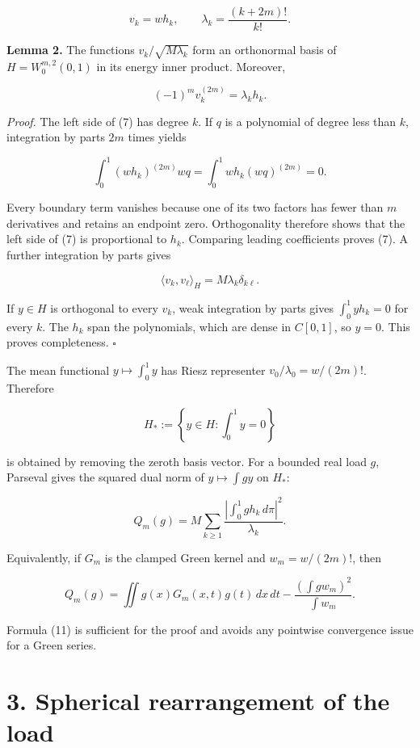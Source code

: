\documentclass[11pt]{article}
\begin{document}
\[
v_k=wh_k,\qquad \lambda_k=\frac{(k+2m)!}{k!}.
\tag{6}
\]

\textbf{Lemma 2.} The functions \(v_k/\sqrt{M\lambda_k}\) form an
orthonormal basis of \(H=W_0^{m,2}(0,1)\) in its energy inner product.
Moreover,

\[
(-1)^m v_k^{(2m)}=\lambda_k h_k.
\tag{7}
\]

\emph{Proof.} The left side of (7) has degree \(k\). If \(q\) is a
polynomial of degree less than \(k\), integration by parts \(2m\) times
yields

\[
\int_0^1 (wh_k)^{(2m)}wq
=\int_0^1 wh_k(wq)^{(2m)}=0.
\tag{8}
\]

Every boundary term vanishes because one of its two factors has fewer
than \(m\) derivatives and retains an endpoint zero. Orthogonality
therefore shows that the left side of (7) is proportional to \(h_k\).
Comparing leading coefficients proves (7). A further integration by
parts gives

\[
\langle v_k,v_\ell\rangle_H=M\lambda_k\delta_{k\ell}.
\tag{9}
\]

If \(y\in H\) is orthogonal to every \(v_k\), weak integration by parts
gives \(\int_0^1 yh_k=0\) for every \(k\). The \(h_k\) span the
polynomials, which are dense in \(C[0,1]\), so \(y=0\). This proves
completeness. \(\square\)

The mean functional \(y\mapsto\int_0^1y\) has Riesz representer
\(v_0/\lambda_0=w/(2m)!\). Therefore

\[
H_*:=\left\{y\in H:\int_0^1y=0\right\}
\tag{10}
\]

is obtained by removing the zeroth basis vector. For a bounded real load
\(g\), Parseval gives the squared dual norm of \(y\mapsto\int gy\) on
\(H_*\):

\[
Q_m(g)
=M\sum_{k\ge1}\frac{\left|\int_0^1gh_k\,d\pi\right|^2}{\lambda_k}.
\tag{11}
\]

Equivalently, if \(G_m\) is the clamped Green kernel and
\(w_m=w/(2m)!\), then

\[
Q_m(g)=\iint g(x)G_m(x,t)g(t)\,dx\,dt
-\frac{\left(\int gw_m\right)^2}{\int w_m}.
\tag{12}
\]

Formula (11) is sufficient for the proof and avoids any pointwise
convergence issue for a Green series.

\section{3. Spherical rearrangement of the
load}\label{spherical-rearrangement-of-the-load}
\end{document}
